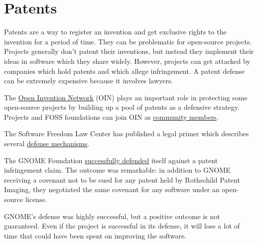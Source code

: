 


\chapter{Patents}

Patents are a way to register an invention and get exclusive rights to the invention for a period of time.  They can be problematic for open-source projects.  Projects generally don't patent their inventions, but instead they implement their ideas in software which they share widely.  However, projects can get attacked by companies which hold patents and which allege infringement.  A patent defense can be extremely expensive because it involves lawyers.

The \href{https://openinventionnetwork.com/}{Open Invention Network} (OIN) plays an important role in protecting some open-source projects by building up a pool of patents as a defensive strategy.  Projects and FOSS foundations can join OIN as \href{https://openinventionnetwork.com/our-members/community-members/}{community members}.

The Software Freedom Law Center has published a legal primer which describes several \href{http://www.softwarefreedom.org/resources/2008/foss-primer.html#x1-390004}{defense mechanisms}.

\begin{kaobox}[frametitle=Patent case against GNOME]

The GNOME Foundation \href{https://foundation.gnome.org/2020/05/20/patent-case-against-gnome-resolved/}{successfully defended} itself against a patent infringement claim.  The outcome was remarkable: in addition to GNOME receiving a covenant not to be sued for any patent held by Rothschild Patent Imaging, they negotiated the same covenant for any software under an open-source license.

GNOME's defense was highly successful, but a positive outcome is not guaranteed.  Even if the project is successful in its defense, it will lose a lot of time that could have been spent on improving the software.

\end{kaobox}

